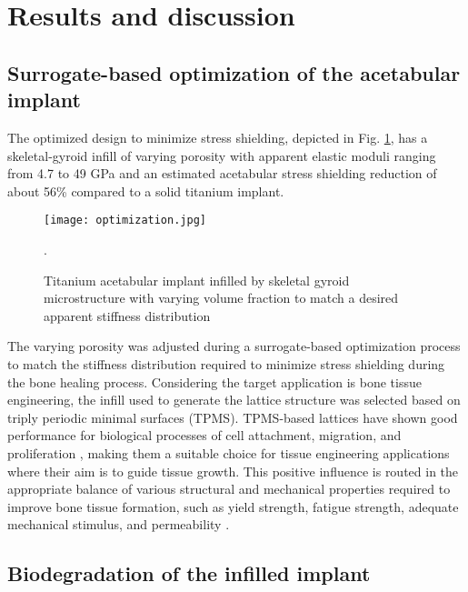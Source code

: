 \section{Results and discussion}

\subsection{Surrogate-based optimization of the acetabular implant}

The optimized design to minimize stress shielding, depicted in Fig. \ref{fig:cup_optimization},  has a skeletal-gyroid infill of varying porosity with apparent elastic moduli ranging from 4.7 to 49 GPa and an estimated acetabular stress shielding reduction of about 56\% compared to a solid titanium implant.

\begin{figure}[h]
\centering
\medskip
\texttt{[image: optimization.jpg]}
\caption[Acetabular implant infilled by skeletal gyroid microstructure with varying volume fraction]{Titanium acetabular implant infilled by skeletal gyroid microstructure with varying volume fraction to match a desired apparent stiffness distribution  \cite{Perez-Boerema2022}}. \label{fig:cup_optimization}
\end{figure}

The varying porosity was adjusted during a surrogate-based optimization process to match the stiffness distribution required to minimize stress shielding during the bone healing process. Considering the target application is bone tissue engineering, the infill used to generate the lattice structure was selected based on triply periodic minimal surfaces (\gls{TPMS}). \gls{TPMS}-based lattices have shown good performance for biological processes of cell attachment, migration, and proliferation \cite{RAJAGOPALAN2006,Hede2021}, making them a suitable choice for tissue engineering applications where their aim is to guide tissue growth. This positive influence is routed in the appropriate balance of various structural and mechanical properties required to improve bone tissue formation, such as yield strength, fatigue strength, adequate mechanical stimulus, and permeability \cite{OtextquotesingleBrien2011,Hollister2005}.

\subsection{Biodegradation of the infilled implant}

